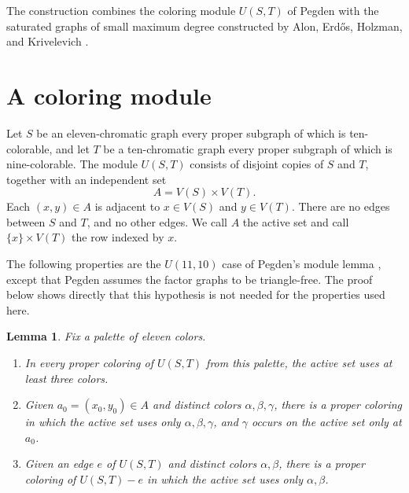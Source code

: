 \documentclass[11pt]{article}
\newtheorem{lemma}[theorem]{Lemma}
\numberwithin{equation}{section}
\begin{document}
The construction combines the coloring module \(U(S,T)\) of
Pegden \cite{Pegden} with the saturated graphs of small maximum degree
constructed by Alon, Erd\H{o}s, Holzman, and Krivelevich \cite{AEHK}.

\section{A coloring module}
\label{sec:module}

Let \(S\) be an eleven-chromatic graph every proper subgraph of which
is ten-colorable, and let \(T\) be a ten-chromatic graph every proper
subgraph of which is nine-colorable. The module \(U(S,T)\) consists of
disjoint copies of \(S\) and \(T\), together with an independent set
\[
 A=V(S)\times V(T).
\]
Each \((x,y)\in A\) is adjacent to \(x\in V(S)\) and
\(y\in V(T)\). There are no edges between \(S\) and \(T\), and
no other edges. We call \(A\) the active set and call
\(\{x\}\times V(T)\) the row indexed by \(x\).

The following properties are the \(U(11,10)\) case of Pegden's
module lemma \cite[Lemma 2.5]{Pegden}, except that Pegden assumes the
factor graphs to be triangle-free. The proof below shows directly that
this hypothesis is not needed for the properties used here.

\begin{lemma}\label{lem:module}
Fix a palette of eleven colors.
\begin{enumerate}
\item In every proper coloring of \(U(S,T)\) from this palette,
the active set uses at least three colors.
\item Given \(a_0=(x_0,y_0)\in A\) and distinct colors
\(\alpha,\beta,\gamma\), there is a proper coloring in which
the active set uses only \(\alpha,\beta,\gamma\), and
\(\gamma\) occurs on the active set only at \(a_0\).
\item Given an edge \(e\) of \(U(S,T)\) and distinct colors
\(\alpha,\beta\), there is a proper coloring of \(U(S,T)-e\)
in which the active set uses only \(\alpha,\beta\).
\end{enumerate}
\end{lemma}
\end{document}

